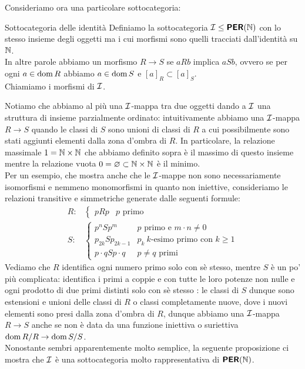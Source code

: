 \documentclass[openany]{book}
\begin{document}
Consideriamo ora una particolare sottocategoria:

\begin{definition}{Sottocategoria delle identità}{}
    Definiamo la sottocategoria $\mathcal{I}\le \text{\sffamily\textbf{PER}}(\mathbb{N})$ con lo stesso insieme degli oggetti ma i cui morfismi sono quelli tracciati dall'identità su $\mathbb{N}$.\\
    In altre parole abbiamo un morfismo $R\to S$ se $aRb$ implica $aSb$, ovvero se per ogni $a\in \operatorname{dom} R$ abbiamo $a \in \operatorname{dom} S$ e $[a]_R \subset [a]_S$.\\
    Chiamiamo  i morfismi di $\mathcal{I}$.
\end{definition}

Notiamo che abbiamo al più una $\mathcal{I}$-mappa tra due oggetti dando a $\mathcal{I}$ una struttura di insieme parzialmente ordinato: intuitivamente abbiamo una $\mathcal{I}$-mappa $R\to S$ quando le classi di $S$ sono unioni di classi di $R$ a cui possibilmente sono stati aggiunti elementi dalla zona d'ombra di $R$. In particolare, la relazione massimale $1 = \mathbb{N}\times\mathbb{N}$ che abbiamo definito sopra è il massimo di questo insieme mentre la relazione vuota $0 = \varnothing\subset \mathbb{N}\times\mathbb{N}$ è il minimo.\\
Per un esempio, che mostra anche che le $\mathcal{I}$-mappe non sono necessariamente isomorfismi e nemmeno monomorfismi in quanto non iniettive, consideriamo le relazioni transitive e simmetriche generate dalle seguenti formule:
\begin{align*}
    R: & \begin{cases} pRp & p\text{ primo}\end{cases}\\
    S: & \begin{cases}
    p^nSp^m & p\text{ primo e }m\cdot n \neq 0 \\
    p_{2k} S p_{2k-1} & p_k\ k\text{-esimo primo con }k\ge 1\\
    p\cdot q S p \cdot q & p\neq q\text{ primi}
\end{cases}
\end{align*}
Vediamo che $R$ identifica ogni numero primo solo con sè stesso, mentre $S$ è un po' più complicata: identifica i primi a coppie e con tutte le loro potenze non nulle e ogni prodotto di due primi distinti solo con sè stesso : le classi di $S$ dunque sono estensioni e unioni delle classi di $R$ o classi completamente nuove, dove i nuovi elementi sono presi dalla zona d'ombra di $R$, dunque abbiamo una $\mathcal{I}$-mappa $R\to S$ anche se non è data da una funzione iniettiva o suriettiva $\operatorname{dom} R/R \to \operatorname{dom} S/S$.\\
Nonostante sembri apparentemente molto semplice, la seguente proposizione ci mostra che $\mathcal{I}$ è una sottocategoria molto rappresentativa di $\text{\sffamily\textbf{PER}}(\mathbb{N})$.
\end{document}
